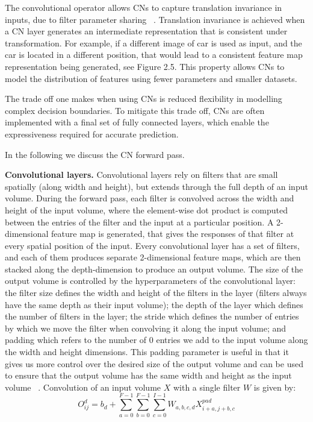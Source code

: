 \noindent The convolutional operator allows CNs to capture translation invariance in inputs, due to filter parameter sharing \unskip ~\citep{simonyan2014very}. Translation invariance is achieved when a CN layer generates an intermediate representation that is consistent under transformation. For example, if a different image of  car is used as input, and the car is located in a different position, that would lead to a consistent feature map representation being generated, see Figure 2.5. This property allows CNs to model the distribution of features using fewer parameters and smaller datasets. \par 

\noindent The trade off one makes when using CNs is reduced flexibility in modelling complex decision boundaries. To mitigate this trade off, CNs are often implemented with a final set of fully connected layers, which enable the expressiveness required for accurate prediction. \par

\noindent In the following we discuss the CN forward pass. \par

\noindent \textbf{Convolutional layers.} Convolutional layers rely on filters that are small spatially (along width and height), but extends through the full depth of an input volume. During the forward pass, each filter is convolved across the width and height of the input volume, where the element-wise dot product is computed between the entries of the filter and the input at a particular position. A 2-dimensional feature map is generated, that gives the responses of that filter at every spatial position of the input. Every convolutional layer has a set of filters, and each of them produces separate 2-dimensional feature maps, which are then stacked along the depth-dimension to produce an output volume. The size of the output volume is controlled by the hyperparameters of the convolutional layer: the filter size defines the width and height of the filters in the layer (filters always have the same depth as their input volume); the depth of the layer which defines the number of filters in the layer; the stride which defines the number of entries by which we move the filter when convolving it along the input volume; and padding which refers to the number of 0 entries we add to the input volume along the width and height dimensions. This padding parameter is useful in that it gives us more control over the desired size of the output volume and can be used to ensure that the output volume has the same width and height as the input volume \unskip ~\citep{DLIndaba2017}. Convolution of an input volume $X$ with a single filter $W$ is given by: 
\begin{equation}
	O_{ij}^{d} = b_d + \sum_{a=0}^{F - 1}\sum_{b=0}^{F - 1}\sum_{c=0}^{I - 1}W_{a,b,c,d}X_{i+a,j+b,c}^{pad}
\end{equation}


